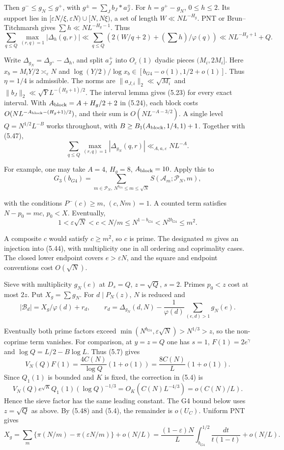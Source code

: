 Then $g^-\le g_N\le g^+$, with $g^\pm=\sum_Jb_J*a_J^\pm$.
For $h=g^+-g_N$, $0\le h\le2$.
Its support lies in
$[\varepsilon N/\xi,\varepsilon N)\cup[N,N\xi)$,
a set of length $W\ll NL^{-H_g}$.
PNT or Brun--Titchmarsh gives $\sum h\ll NL^{-H_g-1}$.
Thus
\[
 \sum_{q\le Q}\max_{(r,q)=1}|\Delta_h(q,r)|
 \ll\sum_{q\le Q}\left(2(W/q+2)+(\sum h)/\varphi(q)\right)
 \ll NL^{-H_g+1}+Q.
\tag{5.47}
\]

Write $\Delta_{g_N}=\Delta_{g^+}-\Delta_h$, and split $a_J^+$ into $O_\varepsilon(1)$ dyadic pieces $(M_i,2M_i]$.
Here $x_b=M_iY/2\asymp_\varepsilon N$ and
$\log(Y/2)/\log x_b\in[b_{G4}-o(1),1/2+o(1)]$.
Thus $\eta=1/4$ is admissible.
The norms are $\|a_{J,i}\|_2\ll\sqrt{M_i}$ and
$\|b_J\|_2\ll\sqrt YL^{-(H_g+1)/2}$.
The interval lemma gives (5.23) for every exact interval.
With $A_{\rm block}=A+H_g/2+2$ in (5.24),
each block costs $O(NL^{-A_{\rm block}-(H_g+1)/2})$,
and their sum is $O(NL^{-A-3/2})$.
A single level $Q=N^{1/2}L^{-B}$ works throughout, with
$B\ge B_1(A_{\rm block},1/4,1)+1$.
Together with (5.47),
\[
 \sum_{q\le Q}\max_{(r,q)=1}|\Delta_{g_N}(q,r)|\ll_{A,a,\varepsilon}NL^{-A}.
\tag{5.48}
\]

For example, one may take $A=4$, $H_g=8$, $A_{\rm block}=10$.
Apply this to
\[
 G_3(b_{G4})=\sum_{m\in\mathcal P_N,\ N^{b_{G4}}\le m\le\sqrt N}
            S(\mathcal A_m;\mathcal P_N,m),
\tag{5.49}
\]

with the conditions $P^-(c)\ge m$, $(c,Nm)=1$.
A counted term satisfies $N-p_0=mc$, $p_0<X$.
Eventually,
\[
 1<\varepsilon\sqrt N<c<N/m\le N^{1-b_{G4}}<N^{2b_{G4}}\le m^2.
\]

A composite $c$ would satisfy $c\ge m^2$, so $c$ is prime.
The designated $m$ gives an injection into (5.44),
with multiplicity one in all ordering and coprimality cases.
The closed lower endpoint covers $e>\varepsilon N$,
and the square and endpoint conventions cost $O(\sqrt N)$.

Sieve with multiplicity $g_N(e)$ at $D_s=Q$, $z=\sqrt Q$, $s=2$.
Primes $p_0<z$ cost at most $2z$. Put $X_g=\sum g_N$.
For $d\mid P_N(z)$, $N$ is reduced and
\[
 |\mathcal B_d|=X_g/\varphi(d)+r_d,\qquad
 r_d=\Delta_{g_N}(d,N)-\frac1{\varphi(d)}\sum_{(e,d)>1}g_N(e).
\tag{5.50}
\]

Eventually both prime factors exceed
$\min(N^{b_{G4}},\varepsilon\sqrt N)>N^{1/3}>z$,
so the non-coprime term vanishes.
For comparison, at $y=z=Q$ one has $s=1$, $F(1)=2e^\gamma$
and $\log Q=L/2-B\log L$.
Thus (5.7) gives
\[
 V_N(Q)F(1)=\frac{4C(N)}{\log Q}(1+o(1))
 =\frac{8C(N)}L(1+o(1)).
\]
Since $Q_1(1)$ is bounded and $K$ is fixed, the correction in (5.4) is
\[
 V_N(Q)e^{\sqrt K}Q_1(1)(\log Q)^{-1/3}
 =O_K(C(N)L^{-4/3})=o(C(N)/L).
\]
Hence the sieve factor has the same leading constant.
The G4 bound below uses $z=\sqrt Q$ as above.
By (5.48) and (5.4), the remainder is $o(U_C)$.
Uniform PNT gives
\[
 X_g=\sum_m\{\pi(N/m)-\pi(\varepsilon N/m)\}+o(N/L)
 =\frac{(1-\varepsilon)N}{L}
     \int_{b_{G4}}^{1/2}\frac{dt}{t(1-t)}+o(N/L).
\tag{5.51}
\]

